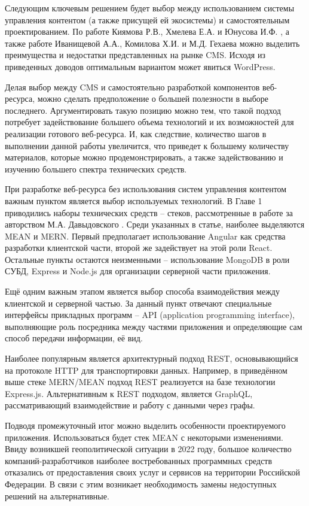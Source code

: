 Следующим ключевым решением будет выбор между использованием системы управления контентом (а также присущей ей экосистемы) и самостоятельным проектированием.
По работе Киямова Р.В., Хмелева Е.А. и Юнусова И.Ф. \cite{kiyamov-cms}, а также работе Иванищевой А.А., Комилова Х.И. и М.Д. Гехаева \cite{ivanisheva-cms} можно выделить преимущества и недостатки представленных на рынке CMS.
Исходя из приведенных доводов оптимальным вариантом может явиться WordPress.

Делая выбор между CMS и самостоятельно разработкой компонентов веб-ресурса, можно сделать предположение о большей полезности в выборе последнего.
Аргументировать такую позицию можно тем, что такой подход потребует задействование большего объема технологий и их возможностей для реализации готового веб-ресурса.
И, как следствие, количество шагов в выполнении данной работы увеличится, что приведет к большему количеству материалов, которые можно продемонстрировать, а также задействованию и изучению большего спектра технических средств.

При разработке веб-ресурса без использования систем управления контентом важным пунктом является выбор используемых технологий.
В Главе 1 приводились наборы технических средств -- стеков, рассмотренные в работе за авторством М.А. Давыдовского \cite{davidovsky-vibor}.
Среди указанных в статье, наиболее выделяются MEAN и MERN.
Первый предполагает использование Angular как средства разработки клиентской части, второй же задействует на этой роли React.
Остальные пункты остаются неизменными -- использование MongoDB в роли СУБД, Express и Node.js для организации серверной части приложения.

Ещё одним важным этапом является выбор способа взаимодействия между клиентской и серверной частью.
За данный пункт отвечают специальные интерфейсы прикладных программ -- API (application programming interface), выполняющие роль посредника между частями приложения и определяющие сам способ передачи информации, её вид.

Наиболее популярным является архитектурный подход REST, основывающийся на протоколе HTTP для транспортировки данных.
Например, в приведённом выше стеке MERN/MEAN подход REST реализуется на базе технологии Express.js.
Альтернативным к REST подходом, является GraphQL, рассматривающий взаимодействие и работу с данными через графы.

Подводя промежуточный итог можно выделить особенности проектируемого приложения.
Использоваться будет стек MEAN с некоторыми изменениями.
Ввиду возникшей геополитической ситуации в 2022 году, большое количество компаний-разработчиков наиболее востребованных программных средств отказались от предоставления своих услуг и сервисов на территории Российской Федерации.
В связи с этим возникает необходимость замены недоступных решений на альтернативные.

